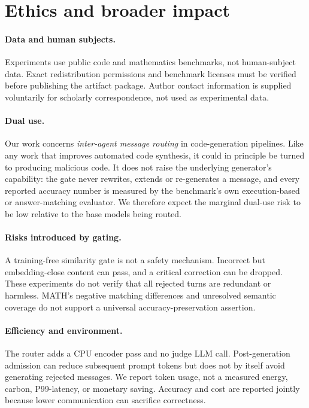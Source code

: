 \documentclass[11pt,twoside,twocolumn,letterpaper]{article}
\begin{document}
\section{Ethics and broader impact}\label{app:ethics}

\paragraph{Data and human subjects.} Experiments use public code and mathematics benchmarks, not human-subject data. Exact redistribution permissions and benchmark licenses must be verified before publishing the artifact package. Author contact information is supplied voluntarily for scholarly correspondence, not used as experimental data.

\paragraph{Dual use.} Our work concerns \emph{inter-agent message routing} in code-generation pipelines. Like any work that improves automated code synthesis, it could in principle be turned to producing malicious code. It does not raise the underlying generator's capability: the gate never rewrites, extends or re-generates a message, and every reported accuracy number is measured by the benchmark's own execution-based or answer-matching evaluator. We therefore expect the marginal dual-use risk to be low relative to the base models being routed.

\paragraph{Risks introduced by gating.} A training-free similarity gate is not a safety mechanism. Incorrect but embedding-close content can pass, and a critical correction can be dropped. These experiments do not verify that all rejected turns are redundant or harmless. MATH's negative matching differences and unresolved semantic coverage do not support a universal accuracy-preservation assertion.

\paragraph{Efficiency and environment.} The router adds a CPU encoder pass and no judge LLM call. Post-generation admission can reduce subsequent prompt tokens but does not by itself avoid generating rejected messages. We report token usage, not a measured energy, carbon, P99-latency, or monetary saving. Accuracy and cost are reported jointly because lower communication can sacrifice correctness.
\end{document}

